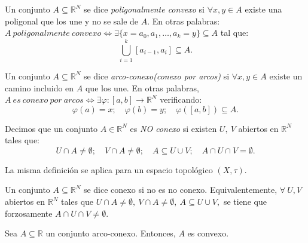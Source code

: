 \begin{ndef}
Un conjunto $A\subseteq \mathbb{R}^N$ se dice \textit{poligonalmente convexo} si  $\forall x,y \in A$ existe una poligonal que los une y no se sale de $A$. En otras palabras:  $A\ poligonalmente\ convexo \iff \exists \{x= a_0, a_1,\dots,a_k=y \}\subseteq A$ tal que: $$\bigcup_{i=1}^k [a_{i-1},a_i] \subseteq A.$$
\end{ndef}



\begin{ndef}
Un conjunto $A \subseteq \mathbb{R}^N$ se dice \emph{arco-conexo(conexo por arcos)} si $\forall x,y \in A$ existe un camino incluido en $A$ que los une. En otras palabras,  $A\ es\ conexo\ por\ arcos \iff \exists \varphi:[a,b] \longrightarrow \mathbb{R}^N$ verificando: $$\varphi(a) = x;\quad \varphi(b) = y;\quad \varphi([a,b]) \subseteq A.$$
\end{ndef}



\begin{ndef}
Decimos que un conjunto $A\in \mathbb{R}^N$ es \textit{NO conexo} si existen $U,\ V$ abiertos en $\mathbb{R}^N$ tales que: $$U \cap A \ne \emptyset;\quad V \cap A \ne \emptyset;\quad A \subseteq U \cup V;\quad A \cap U \cap V = \emptyset.$$
\end{ndef}



\begin{nota}
La misma definición se aplica para un espacio topológico $(X,\tau).$
\end{nota}



\begin{ndef}
Un conjunto $A\subseteq \mathbb{R}^N$ se dice conexo si no es no conexo. Equivalentemente, $\forall \ U,V$ abiertos en $\mathbb{R}^N$ tales que $U \cap A \ne \emptyset, \ V \cap A \ne \emptyset,\ A \subseteq U \cup V,$ se tiene que forzosamente $A \cap U \cap V \ne \emptyset$.
\end{ndef}



\begin{nprop}
Sea $A\subseteq \mathbb{R}$ un conjunto arco-conexo. Entonces, $A$ es convexo.
\end{nprop}

